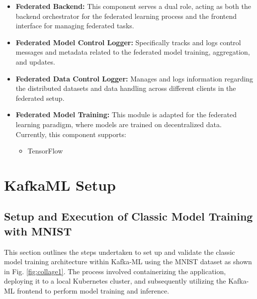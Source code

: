 \begin{itemize}
    \item \textbf{Federated Backend:} This component serves a dual role, acting as both the backend orchestrator for the federated learning process and the frontend interface for managing federated tasks.
    \item \textbf{Federated Model Control Logger:} Specifically tracks and logs control messages and metadata related to the federated model training, aggregation, and updates.
    \item \textbf{Federated Data Control Logger:} Manages and logs information regarding the distributed datasets and data handling across different clients in the federated setup.
    \item \textbf{Federated Model Training:} This module is adapted for the federated learning paradigm, where models are trained on decentralized data. Currently, this component supports:
    \begin{itemize}
        \item TensorFlow
    \end{itemize}
\end{itemize}

\section{KafkaML Setup}


\subsection{Setup and Execution of Classic Model Training with MNIST}
\label{subsec:classic_mnist_setup}

This section outlines the steps undertaken to set up and validate the classic model training architecture within Kafka-ML using the MNIST dataset as shown in Fig. \ref{fig:collage1}. The process involved containerizing the application, deploying it to a local Kubernetes cluster, and subsequently utilizing the Kafka-ML frontend to perform model training and inference.


